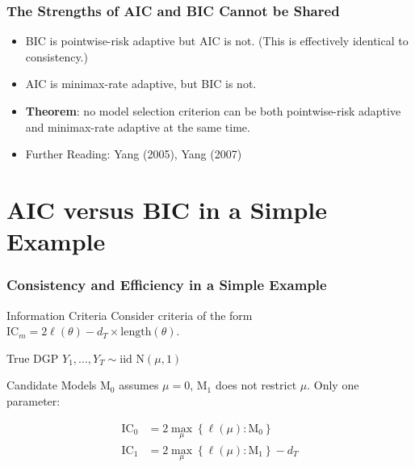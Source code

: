 \begin{frame}
  \frametitle{The Strengths of AIC and BIC Cannot be Shared}

  \begin{itemize}
    \item BIC is pointwise-risk adaptive but AIC is not. (This is effectively identical to consistency.)
    \item AIC is minimax-rate adaptive, but BIC is not.
    \item \textbf{Theorem}: no model selection criterion can be both pointwise-risk adaptive and minimax-rate adaptive at the same time.
    \item Further Reading: Yang (2005), Yang (2007)
  \end{itemize}

\end{frame}
\section{AIC versus BIC in a Simple Example}
\begin{frame}
  \frametitle{Consistency and Efficiency in a Simple Example}

  \begin{block}{Information Criteria}
    Consider criteria of the form $\text{IC}_m = 2\ell(\theta) - d_T \times \text{length}(\theta)$.
  \end{block}
 
  \pause
  
  \begin{block}{True DGP}
  $Y_{1}, \dots, Y_T \sim \mbox{iid N}(\mu, 1)$
  \end{block}

  \pause

  \begin{block}{Candidate Models}
    $\text{M}_0$ assumes $\mu = 0$, $\text{M}_1$ does not restrict $\mu$. Only one parameter:

    \vspace{-1em}
  \begin{align*}
    \text{IC}_0 &= 2 \max_\mu \left\{ \ell(\mu) \colon \text{M}_0 \right\} \\ 
    \text{IC}_1 &= 2 \max_\mu \left\{ \ell(\mu) \colon \text{M}_1 \right\} - d_T
  \end{align*}
  \end{block}


\end{frame}

